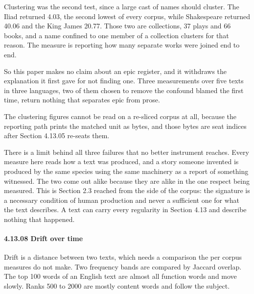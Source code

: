 Clustering was the second test, since a large cast of names should cluster. The Iliad returned 4.03, the second lowest of every corpus, while Shakespeare returned 40.06 and the King James 20.77. Those two are collections, 37 plays and 66 books, and a name confined to one member of a collection clusters for that reason. The measure is reporting how many separate works were joined end to end.

So this paper makes no claim about an epic register, and it withdraws the explanation it first gave for not finding one. Three measurements over five texts in three languages, two of them chosen to remove the confound blamed the first time, return nothing that separates epic from prose.

The clustering figures cannot be read on a re-sliced corpus at all, because the reporting path prints the matched unit as bytes, and those bytes are seat indices after Section 4.13.05 re-seats them.

There is a limit behind all three failures that no better instrument reaches. Every measure here reads how a text was produced, and a story someone invented is produced by the same species using the same machinery as a report of something witnessed. The two come out alike because they are alike in the one respect being measured. This is Section 2.3 reached from the side of the corpus: the signature is a necessary condition of human production and never a sufficient one for what the text describes. A text can carry every regularity in Section 4.13 and describe nothing that happened.

\paragraph{4.13.08 Drift over time}

Drift is a distance between two texts, which needs a comparison the per corpus measures do not make. Two frequency bands are compared by Jaccard overlap. The top 100 words of an English text are almost all function words and move slowly. Ranks 500 to 2000 are mostly content words and follow the subject.


